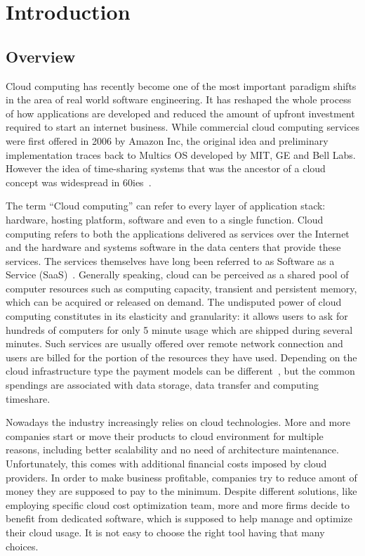 \documentclass[licencjacka,en]{thesisclass}
\begin{document}
    \chapter{Introduction}


    \section{Overview}

    Cloud computing has recently become one of the most important paradigm shifts
    in the area of real world software engineering.
    It has reshaped the whole process of how applications are developed
    and reduced the amount of upfront
    investment required to start an internet business.
    While commercial cloud computing services were first offered
    in 2006 by Amazon Inc, the original idea and preliminary
    implementation traces back to Multics OS developed by MIT,
    GE and Bell Labs.
    However the idea of time-sharing systems that was the ancestor of a cloud
    concept was widespread in 60ies~\cite{Markus}.

    The term “Cloud computing” can refer to every layer of application stack:
    hardware, hosting platform, software and even to a single function.
    Cloud computing refers to both the applications delivered as services over the Internet
    and the hardware and systems software in the data centers that provide these services.
    The services themselves have long been referred to
    as Software as a Service (SaaS)~\cite{Armbrust}.
    Generally speaking, cloud can be perceived as a shared pool
    of computer resources such as computing capacity,
    transient and persistent memory, which can be acquired or released on demand.
    The undisputed power of cloud computing constitutes
    in its elasticity and granularity: it allows users
    to ask for hundreds of computers for only 5 minute usage which
    are shipped during several minutes.
    Such services are usually offered over remote network connection and users are billed
    for the portion of the resources they have used.
    Depending on the cloud infrastructure type the payment models
    can be different~\cite{Laatikainen},
    but the common spendings are associated with data storage,
    data transfer and computing timeshare.

    Nowadays the industry increasingly relies on cloud technologies.
    More and more companies start or move their products to cloud environment
    for multiple reasons, including better scalability
    and no need of architecture maintenance.
    Unfortunately, this comes with additional financial costs imposed by cloud providers.
    In order to make business profitable, companies try
    to reduce amont of money they are supposed to pay to the minimum.
    Despite different solutions, like employing specific
    cloud cost optimization team, more and more firms decide
    to benefit from dedicated software, which is supposed to help
    manage and optimize their cloud usage.
    It is not easy to choose the right tool having that many choices.
\end{document}
